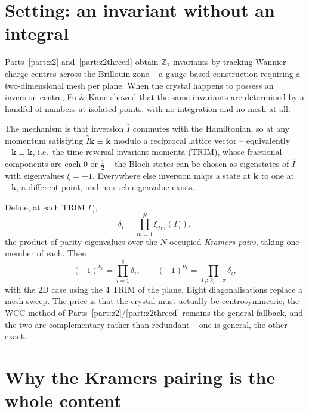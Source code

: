 \documentclass[11pt]{article}
\begin{document}
\section{Setting: an invariant without an integral}

Parts~\ref{part:z2} and~\ref{part:z2threed} obtain $\mathbb Z_2$ invariants by tracking
Wannier charge centres across the Brillouin zone -- a gauge-based construction requiring
a two-dimensional mesh per plane. When the crystal happens to possess an inversion
centre, Fu \& Kane \cite{fukane2007inv} showed that the same invariants are determined by
a handful of numbers at isolated points, with no integration and no mesh at all.

The mechanism is that inversion $\hat I$ commutes with the Hamiltonian, so at any
momentum satisfying $\hat I\mathbf k\equiv\mathbf k$ modulo a reciprocal lattice vector
-- equivalently $-\mathbf k\equiv\mathbf k$, i.e.\ the time-reversal-invariant momenta
(TRIM), whose fractional components are each $0$ or $\tfrac12$ -- the Bloch states can be
chosen as eigenstates of $\hat I$ with eigenvalues $\xi=\pm1$. Everywhere else inversion
maps a state at $\mathbf k$ to one at $-\mathbf k$, a different point, and no such
eigenvalue exists.

Define, at each TRIM $\Gamma_i$,
\begin{equation}
  \delta_i=\prod_{m=1}^{N}\xi_{2m}(\Gamma_i),
  \label{eq:fkdelta}
\end{equation}
the product of parity eigenvalues over the $N$ occupied \emph{Kramers pairs}, taking one
member of each. Then \cite{fukane2007inv,fukanemele2007}
\begin{equation}
  (-1)^{\nu_0}=\prod_{i=1}^{8}\delta_i,
  \qquad
  (-1)^{\nu_k}=\prod_{\Gamma_i:\,k_i=\pi}\delta_i,
  \label{eq:fkz2}
\end{equation}
with the 2D case using the 4 TRIM of the plane. Eight diagonalisations replace a mesh
sweep. The price is that the crystal must actually be centrosymmetric; the WCC method of
Parts~\ref{part:z2}/\ref{part:z2threed} remains the general fallback, and the two are
complementary rather than redundant -- one is general, the other exact.

\section{Why the Kramers pairing is the whole content}
\end{document}
